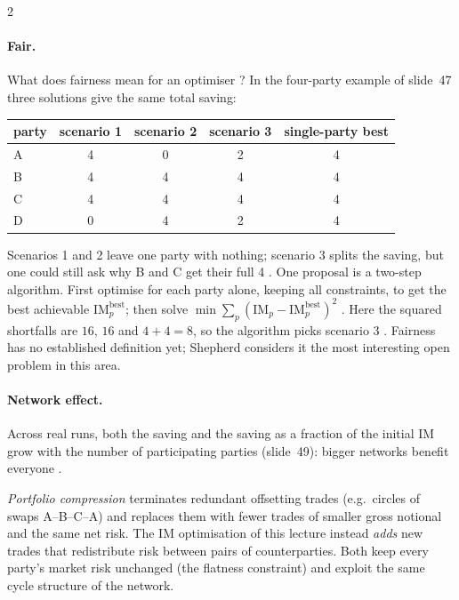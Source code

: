 \begin{paracol}{2}
\paragraph{Fair.} What does fairness mean for an optimiser ? In the four-party example of
slide~47 three solutions give the same total saving:
\begin{center}\small
\begin{tabular}{@{}lcccc@{}}
\toprule
party & scenario 1 & scenario 2 & scenario 3 & single-party best\\
\midrule
A & 4 & 0 & 2 & 4\\
B & 4 & 4 & 4 & 4\\
C & 4 & 4 & 4 & 4\\
D & 0 & 4 & 2 & 4\\
\bottomrule
\end{tabular}
\end{center}
Scenarios 1 and 2 leave one party with nothing; scenario 3 splits the saving, but one could still ask why B and C get
their full 4 . One proposal is a two-step algorithm. First optimise for each party alone, keeping
all constraints, to get the best achievable $\mathrm{IM}_p^{\text{best}}$; then solve
$\min\sum_p(\mathrm{IM}_p-\mathrm{IM}_p^{\text{best}})^2$ . Here the squared shortfalls are
$16$, $16$ and $4+4=8$, so the algorithm picks scenario 3 . Fairness has no established definition
yet; Shepherd considers it the most interesting open problem in this area.

\paragraph{Network effect.} Across real runs, both the saving and the saving as a fraction of the initial IM grow with
the number of participating parties (slide~49): bigger networks benefit everyone .

\begin{finance}
\emph{Portfolio compression} terminates redundant offsetting trades (e.g.\ circles of swaps A--B--C--A) and replaces
them with fewer trades of smaller gross notional and the same net risk. The IM optimisation of this lecture instead
\emph{adds} new trades that redistribute risk between pairs of counterparties. Both keep every party's market risk
unchanged (the flatness constraint) and exploit the same cycle structure of the network.
\end{finance}


\end{paracol}
